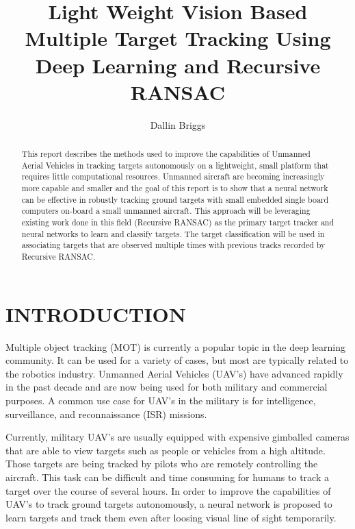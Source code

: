 \documentclass[letterpaper, 10 pt, conference]{ieeeconf}  %
\title{\LARGE \bf
Light Weight Vision Based Multiple Target Tracking Using Deep Learning and Recursive RANSAC
}
\author{Dallin Briggs}
\begin{document}
\maketitle
\thispagestyle{empty}
\pagestyle{empty}


\begin{abstract}

This report describes the methods used to improve the capabilities of Unmanned Aerial Vehicles in tracking targets autonomously on a lightweight, small platform that requires little computational resources. Unmanned aircraft are becoming increasingly more capable and smaller and the goal of this report is to show that a neural network can be effective in robustly tracking ground targets with small embedded single board computers on-board a small unmanned aircraft. This approach will be leveraging existing work done in this field (Recursive RANSAC) as the primary target tracker and neural networks to learn and classify targets. The target classification will be used in associating targets that are observed multiple times with previous tracks recorded by Recursive RANSAC.

\end{abstract}


\section{INTRODUCTION}

Multiple object tracking (MOT) is currently a popular topic in the deep learning community. It can be used for a variety of cases, but most are typically related to the robotics industry. Unmanned Aerial Vehicles (UAV's) have advanced rapidly in the past decade and are now being used for both military and commercial purposes. A common use case for UAV's in the military is for intelligence, surveillance, and reconnaissance (ISR) missions. 

Currently, military UAV's are usually equipped with expensive gimballed cameras that are able to view targets such as people or vehicles from a high altitude. Those targets are being tracked by pilots who are remotely controlling the aircraft. This task can be difficult and time consuming for humans to track a target over the course of several hours. In order to improve the capabilities of UAV's to track ground targets autonomously, a neural network is proposed to learn targets and track them even after loosing visual line of sight temporarily.
\end{document}
